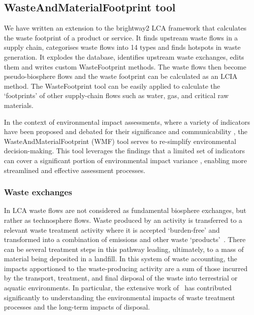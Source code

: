 
\subsection{WasteAndMaterialFootprint tool}\label{sec:results-wmf}
We have written an extension to the brightway2 LCA framework that calculates the waste footprint of a product or service.
It finds upstream waste flows in a supply chain, categorises waste flows into 14 types and finds hotspots in waste generation.
It explodes the database, identifies upstream waste exchanges, edits them and writes custom WasteFootprint methods. The waste flows then become pseudo-biosphere flows and the waste footprint can be calculated as an LCIA method. The WasteFootprint tool can be easily applied to calculate the `footprints' of other supply-chain flows such as water, gas, and critical raw materials.

In the context of environmental impact assessments, where a variety of indicators have been proposed and debated for their significance and communicability \citep{vanham2019footprints,ridoutt2013footprints}, the WasteAndMaterialFootprint (WMF) tool serves to re-simplify environmental decision-making. This tool leverages the findings that a limited set of indicators can cover a significant portion of environmental impact variance \citep{steinmann2017resourcefootprints}, enabling more streamlined and effective assessment processes.

\subsubsection{Waste exchanges}\label{sec:results-wmf-waste_exchanges}

In LCA waste flows are not considered as fundamental biosphere exchanges, but rather as technosphere flows. Waste produced by an activity is transferred to a relevant waste treatment activity where it is accepted `burden-free' and transformed into a combination of emissions and other waste `products'~\citep{guinee2021wasteisnotaservice}. There can be several treatment steps in this pathway leading, ultimately, to a mass of material being deposited in a landfill. In this system of waste accounting, the impacts apportioned to the waste-producing activity are a sum of those incurred by the transport, treatment, and final disposal of the waste into terrestrial or aquatic environments. In particular, the extensive work of~\cite{doka2024publications} has contributed significantly to understanding the environmental impacts of waste treatment processes and the long-term impacts of disposal. 

